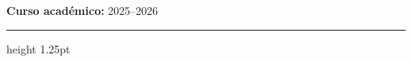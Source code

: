 \begin{titlepage}
\begin{flushleft}


{\large \textbf{Curso académico:} 2025--2026}
\end{flushleft}
\vspace{0.4cm}
\hrule height 1.25pt
\vfill


\end{titlepage}
\newpage
\clearpage\hbox{}\thispagestyle{empty}\newpage